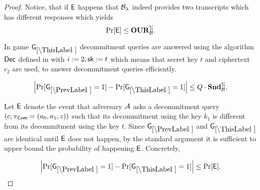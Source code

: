 \begin{proof}
Notice, that if $\mathsf{E}$ happens that $\mathcal{B}_{\lambda}$ indeed provides two transcripts which has different responses which yields
\[\Pr[\mathsf{E}] \leq \mathbf{OUR}^\Sigma_{\mathcal{B}}.\]

In game $\games_\thisgame$ decommitment queries are answered using the algorithm $\mathsf{Dec}$ defined in  with $i:=2, \mathsf{sk}:=t$ which means that secret key $t$ and ciphertext $c_2$ are used, to answer decommitment queries efficiently. 

\begin{lemma}
\[
\left|\Pr[\games_\prevgame = 1] - \Pr[\games_\thisgame = 1]\right| \leq Q\cdot\snd^\Sigma_\advB.
\]
\end{lemma}

Let $\mathsf{E}$ denote the event that adversary $\mathcal{A}$ asks a decommitment query $(c, \pi_{\mathsf{Com}}=(a_0,a_1,z))$ such that its decommitment using the key $k_1$ is different from its decommitment using the key $t$. Since $\games_\prevgame$ and $\games_\thisgame$ are identical until $\mathsf{E}$ does not happen, by the standard argument it is sufficient to upper bound the probability of happening $\mathsf{E}$. Concretely,  

\[
\left|\Pr[\games_\prevgame = 1] - \Pr[\games_\thisgame = 1]\right| \leq \Pr[\event]. 
\]



\end{proof}
